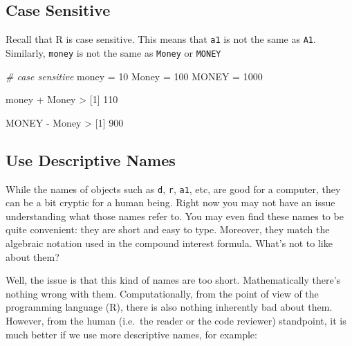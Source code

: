 \documentclass[
]{book}
\newenvironment{Shaded}{\begin{snugshade}}{\end{snugshade}}
\newcommand{\CommentTok}[1]{\textcolor[rgb]{0.56,0.35,0.01}{\textit{#1}}}
\newcommand{\DecValTok}[1]{\textcolor[rgb]{0.00,0.00,0.81}{#1}}
\newcommand{\NormalTok}[1]{#1}
\newcommand{\OtherTok}[1]{\textcolor[rgb]{0.56,0.35,0.01}{#1}}
\newcommand{\SpecialCharTok}[1]{\textcolor[rgb]{0.00,0.00,0.00}{#1}}
\begin{document}
\hypertarget{case-sensitive}{%
\subsection{Case Sensitive}\label{case-sensitive}}

Recall that R is case sensitive. This means that \texttt{a1} is not the same as \texttt{A1}.
Similarly, \texttt{money} is not the same as \texttt{Money} or \texttt{MONEY}

\begin{Shaded}
\begin{Highlighting}[]
\CommentTok{\# case sensitive}
\NormalTok{money }\OtherTok{=} \DecValTok{10}
\NormalTok{Money }\OtherTok{=} \DecValTok{100}
\NormalTok{MONEY }\OtherTok{=} \DecValTok{1000}

\NormalTok{money }\SpecialCharTok{+}\NormalTok{ Money}
\SpecialCharTok{\textgreater{}}\NormalTok{ [}\DecValTok{1}\NormalTok{] }\DecValTok{110}
\end{Highlighting}
\end{Shaded}

\begin{Shaded}
\begin{Highlighting}[]
\NormalTok{MONEY }\SpecialCharTok{{-}}\NormalTok{ Money}
\SpecialCharTok{\textgreater{}}\NormalTok{ [}\DecValTok{1}\NormalTok{] }\DecValTok{900}
\end{Highlighting}
\end{Shaded}

\hypertarget{use-descriptive-names}{%
\subsection{Use Descriptive Names}\label{use-descriptive-names}}

While the names of objects such as \texttt{d}, \texttt{r}, \texttt{a1}, etc, are good for a computer,
they can be a bit cryptic for a human being. Right now you may not have an
issue understanding what those names refer to. You may even find these names
to be quite convenient: they are short and easy to type. Moreover, they
match the algebraic notation used in the compound interest formula. What's not
to like about them?

Well, the issue is that this kind of names are too short. Mathematically
there's nothing wrong with them. Computationally, from the point of view of
the programming language (R), there is also nothing inherently bad about them.
However, from the human (i.e.~the reader or the code reviewer) standpoint, it is
much better if we use more descriptive names, for example:
\end{document}
